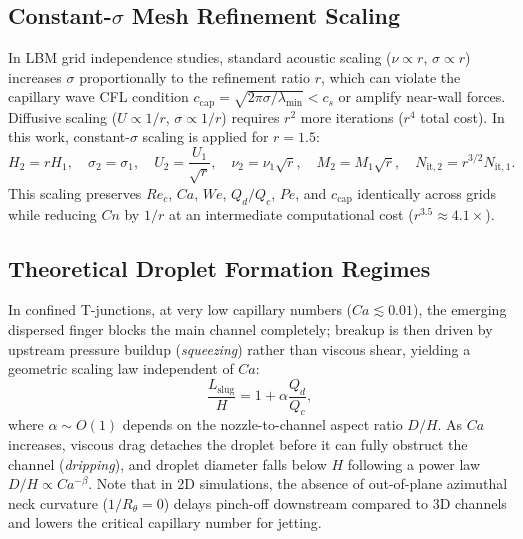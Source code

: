 \documentclass[11pt,a4paper]{article}
\begin{document}
\subsection{Constant-$\sigma$ Mesh Refinement Scaling}

In LBM grid independence studies, standard acoustic scaling ($\nu \propto r$, $\sigma \propto r$) increases $\sigma$ proportionally to the refinement ratio $r$, which can violate the capillary wave CFL condition $c_{\mathrm{cap}} = \sqrt{2\pi\sigma / \lambda_{\min}} < c_s$ or amplify near-wall forces. Diffusive scaling ($U \propto 1/r$, $\sigma \propto 1/r$) requires $r^2$ more iterations ($r^4$ total cost). In this work, constant-$\sigma$ scaling is applied for $r = 1.5$:
\begin{equation}
    H_2 = r H_1, \quad \sigma_2 = \sigma_1, \quad U_2 = \frac{U_1}{\sqrt{r}}, \quad \nu_2 = \nu_1\sqrt{r}, \quad M_2 = M_1\sqrt{r}, \quad N_{\mathrm{it},2} = r^{3/2} N_{\mathrm{it},1}.
\end{equation}
This scaling preserves $Re_c$, $Ca$, $We$, $Q_d/Q_c$, $Pe$, and $c_{\mathrm{cap}}$ identically across grids while reducing $Cn$ by $1/r$ at an intermediate computational cost ($r^{3.5} \approx 4.1\times$).

\subsection{Theoretical Droplet Formation Regimes}

In confined T-junctions, at very low capillary numbers ($Ca \lesssim 0.01$), the emerging dispersed finger blocks the main channel completely; breakup is then driven by upstream pressure buildup (\emph{squeezing}) rather than viscous shear, yielding a geometric scaling law independent of $Ca$:
\begin{equation}
    \frac{L_{\mathrm{slug}}}{H} = 1 + \alpha \frac{Q_d}{Q_c},
\end{equation}
where $\alpha \sim O(1)$ depends on the nozzle-to-channel aspect ratio $D/H$. As $Ca$ increases, viscous drag detaches the droplet before it can fully obstruct the channel (\emph{dripping}), and droplet diameter falls below $H$ following a power law $D/H \propto Ca^{-\beta}$. Note that in 2D simulations, the absence of out-of-plane azimuthal neck curvature ($1/R_\theta = 0$) delays pinch-off downstream compared to 3D channels and lowers the critical capillary number for jetting.

\end{document}
